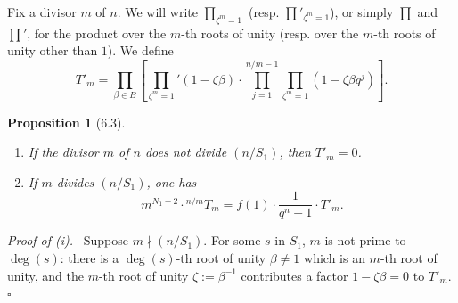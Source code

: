 \documentclass[10pt]{article}
\newcommand{\degm}{\operatorname{deg}}
\theoremstyle{deligne}
\newtheorem*{proposition*}{Proposition}
\newenvironment{proofdel}[1][Proof.]{\textit{#1}\ }{\hfill$\square$}
\begin{document}
Fix a divisor $m$ of $n$. We will write $\prod_{\zeta^m=1}$ (resp. $\prod'_{\zeta^m=1}$), or simply $\prod$ and $\prod'$, for the product over the $m$-th roots of unity (resp. over the $m$-th roots of unity other than $1$). We define
\begin{equation}\tag{6.2.3}
T'_m=\prod_{\beta\in B}\left[\prod_{\zeta^m=1}'(1-\zeta\beta)\cdot
\prod_{j=1}^{n/m-1}\prod_{\zeta^m=1}(1-\zeta\beta q^j)\right].
\end{equation}

\begin{proposition*}[6.3]
\begin{enumerate}[label=(\roman*)]
\item If the divisor $m$ of $n$ does not divide $(n/S_1)$, then $T'_m=0$.
\item If $m$ divides $(n/S_1)$, one has
\begin{equation}\tag{6.3.1}
m^{N_1-2}\cdot{}^{n/m}T_m=f(1)\cdot\frac{1}{q^n-1}\cdot T'_m.
\end{equation}
\end{enumerate}
\end{proposition*}

\begin{proofdel}[Proof of (i).]
Suppose $m\nmid(n/S_1)$. For some $s$ in $S_1$, $m$ is not prime to $\degm(s)$: there is a $\degm(s)$-th root of unity $\beta\ne1$ which is an $m$-th root of unity, and the $m$-th root of unity $\zeta:=\beta^{-1}$ contributes a factor $1-\zeta\beta=0$ to $T'_m$.
\end{proofdel}
\end{document}
